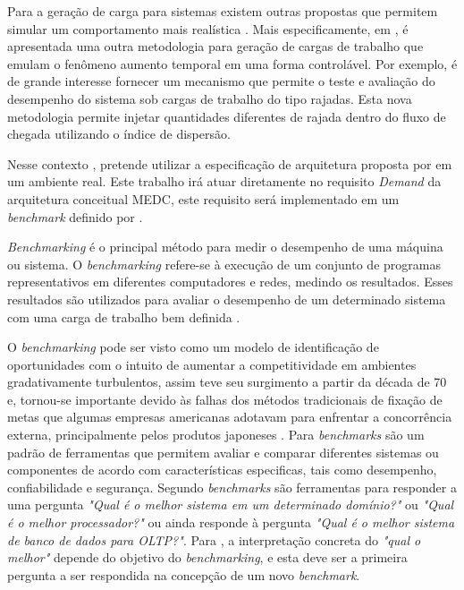Para a geração de carga para sistemas existem outras propostas que permitem simular um comportamento mais realística \cite{Mi2010, Mi2009,Mi2008}. Mais especificamente, em , é apresentada uma outra metodologia para geração de cargas de trabalho que emulam o fenômeno aumento temporal em uma forma controlável. Por exemplo, é de grande interesse fornecer um mecanismo que permite o teste e avaliação do desempenho do sistema sob cargas de trabalho do tipo rajadas. Esta nova metodologia permite injetar quantidades diferentes de rajada dentro do fluxo de chegada utilizando o índice de dispersão. 

Nesse contexto , pretende utilizar a especificação de arquitetura proposta por  em um ambiente real. Este trabalho irá atuar diretamente no requisito \textit{Demand} da arquitetura conceitual MEDC, este requisito será implementado em um \textit{benchmark} definido por .

\textit{Benchmarking} é o principal método para medir o desempenho de uma máquina ou sistema. O \textit{benchmarking} refere-se à execução de um conjunto de programas representativos em diferentes computadores e redes, medindo os resultados. Esses resultados são utilizados para avaliar o desempenho de um determinado sistema com uma carga de trabalho bem definida \cite{Menasce2001}.

O \textit{benchmarking} pode ser visto como um modelo de identificação de oportunidades com o intuito de aumentar a competitividade em ambientes gradativamente turbulentos, assim teve seu surgimento a partir da década de 70 e, tornou-se importante devido às falhas dos métodos tradicionais de fixação de metas que algumas empresas americanas adotavam para enfrentar a concorrência externa, principalmente pelos produtos japoneses \cite{Camila2008}. Para  \textit{benchmarks} são um padrão de ferramentas que permitem avaliar e comparar diferentes sistemas ou componentes de acordo com características especificas, tais como desempenho, confiabilidade e segurança. Segundo  \textit{benchmarks} são ferramentas para responder a uma pergunta \textit{"Qual é o melhor sistema em um determinado domínio?"} ou  \textit{"Qual é o melhor processador?"} ou ainda responde à pergunta \textit{"Qual é o melhor sistema de banco de dados para OLTP?"}. Para , a interpretação concreta do \textit{"qual o melhor"} depende do objetivo do \textit{benchmarking}, e esta deve ser a primeira pergunta a ser respondida na concepção de um novo \textit{benchmark}. 


